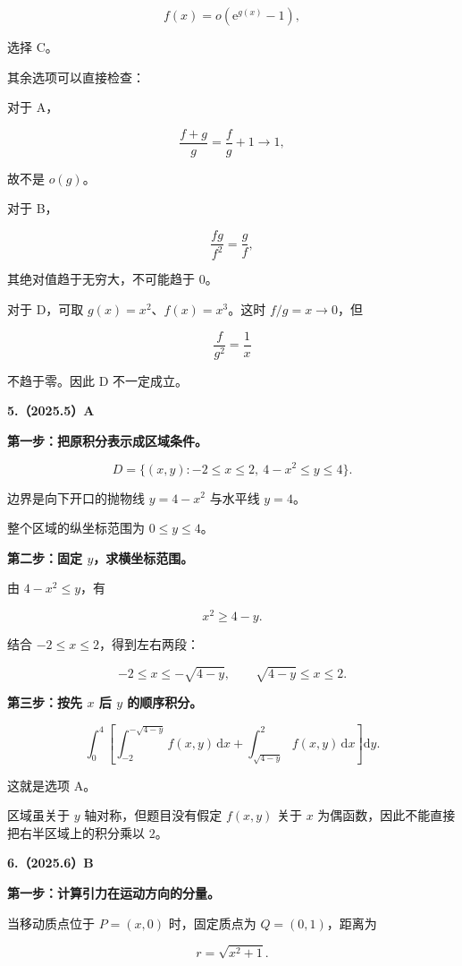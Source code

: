 \documentclass[UTF8,11pt,fontset=windows]{ctexart}
\begin{document}
$$
\boxed{f(x)=o(\mathrm e^{g(x)}-1)},
$$

选择 C。

其余选项可以直接检查：

对于 A，

$$
\frac{f+g}{g}=\frac fg+1\longrightarrow1,
$$

故不是 $o(g)$。

对于 B，

$$
\frac{fg}{f^2}=\frac gf,
$$

其绝对值趋于无穷大，不可能趋于 $0$。

对于 D，可取 $g(x)=x^2$、$f(x)=x^3$。这时 $f/g=x\to0$，但

$$
\frac{f}{g^2}=\frac1x
$$

不趋于零。因此 D 不一定成立。

\clearpage

\textbf{5.（2025.5）A}

\textbf{第一步：把原积分表示成区域条件。}

$$
D=\{(x,y):-2\le x\le2,\ 4-x^2\le y\le4\}.
$$

边界是向下开口的抛物线 $y=4-x^2$ 与水平线 $y=4$。

整个区域的纵坐标范围为 $0\le y\le4$。

\textbf{第二步：固定 $y$，求横坐标范围。}

由 $4-x^2\le y$，有

$$
x^2\ge4-y.
$$

结合 $-2\le x\le2$，得到左右两段：

$$
-2\le x\le-\sqrt{4-y},
\qquad \sqrt{4-y}\le x\le2.
$$

\textbf{第三步：按先 $x$ 后 $y$ 的顺序积分。}

$$
\boxed{
\int_0^4\left[
\int_{-2}^{-\sqrt{4-y}}f(x,y)\,\mathrm dx
+\int_{\sqrt{4-y}}^2f(x,y)\,\mathrm dx
\right]\mathrm dy}.
$$

这就是选项 A。

区域虽关于 $y$ 轴对称，但题目没有假定 $f(x,y)$ 关于 $x$ 为偶函数，因此不能直接把右半区域上的积分乘以 $2$。

\clearpage

\textbf{6.（2025.6）B}

\textbf{第一步：计算引力在运动方向的分量。}

当移动质点位于 $P=(x,0)$ 时，固定质点为 $Q=(0,1)$，距离为

$$
r=\sqrt{x^2+1}.
$$
\end{document}

